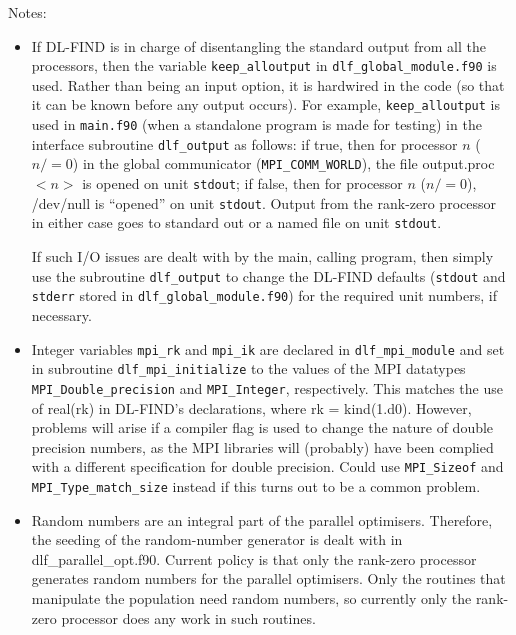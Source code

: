 \documentclass{article}
\begin{document}
Notes:
\begin{itemize}
\item If DL-FIND is in charge of disentangling the standard output from all the processors, then the 
variable \texttt{keep\_alloutput} in \texttt{dlf\_global\_module.f90} is used.
Rather than being an input option, 
it is hardwired in the code (so that it can be known before any output occurs).
For example, \texttt{keep\_alloutput} is used in \texttt{main.f90} (when a standalone program is made for testing) in the 
interface subroutine \texttt{dlf\_output} as follows: if true, then for processor $n$ ($n/=0$) in the global communicator (\texttt{MPI\_COMM\_WORLD}), 
the file output.proc$<n>$ is opened on unit \texttt{stdout}; 
if false, then for processor $n$ ($n/=0$), /dev/null is ``opened'' on unit \texttt{stdout}.
Output from the rank-zero processor in either case goes to standard out or a named file on unit \texttt{stdout}.

If such I/O issues are dealt with by the main, calling program, then simply use the subroutine \texttt{dlf\_output} to 
change the DL-FIND defaults (\texttt{stdout} and \texttt{stderr} stored in 
\texttt{dlf\_global\_module.f90}) for the required unit numbers, if necessary.

\item Integer variables \texttt{mpi\_rk} and \texttt{mpi\_ik} are declared in \texttt{dlf\_mpi\_module} and set in 
subroutine \texttt{dlf\_mpi\_initialize} to the values of the MPI datatypes 
\texttt{MPI\_Double\_precision} and \texttt{MPI\_Integer}, respectively.
This matches the use of real(rk) in DL-FIND's declarations, where rk = kind(1.d0).  However, problems will arise if 
a compiler flag is used to change the nature of double precision numbers, as the MPI libraries will 
(probably) have been complied with a different specification for double precision.  Could use \texttt{MPI\_Sizeof} and 
\texttt{MPI\_Type\_match\_size} instead if this turns out to be a common problem.

\item Random numbers are an integral part of the parallel optimisers.
Therefore, the seeding of the random-number generator is dealt with in dlf\_parallel\_opt.f90.  Current policy 
is that only the rank-zero processor generates random numbers for the parallel optimisers.  Only the routines that manipulate the population 
need random numbers, so currently only the rank-zero processor does any work in such routines.
\end{itemize}
\end{document}

